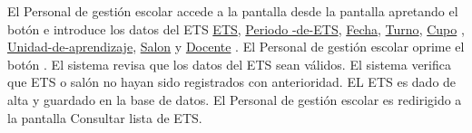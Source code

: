      \begin{UCtrayectoria}
     
         \UCpaso[\UCactor] El Personal de gestión escolar accede a la pantalla \label{CU29.introduceDatos} desde la pantalla  apretando el botón  e introduce los datos del ETS {\hyperlink{ETS.ETS }{ETS},  \hyperlink{ETS.Periodo -de-ETS }{ Periodo -de-ETS},  \hyperlink{ETS.Fecha}{Fecha},  \hyperlink{ETS.Turno}{Turno},  \hyperlink{ETS.Cupo} {Cupo} ,  \hyperlink{ETS.Unidad-de-aprendizaje }{Unidad-de-aprendizaje},  \hyperlink{ETS.Salon}{Salon} y \hyperlink{ETS.Docente}{Docente} .
         \UCpaso[\UCactor] El Personal de gestión escolar oprime el botón .
         \UCpaso El sistema revisa que los datos del ETS sean válidos.
         \UCpaso El sistema verifica que ETS o salón no hayan sido registrados con anterioridad.
         \UCpaso EL ETS es dado de alta y guardado en la base de datos.
         \UCpaso[\UCactor] El Personal de gestión escolar es redirigido a la pantalla  Consultar lista de ETS}.
     
     \end{UCtrayectoria}
     
    